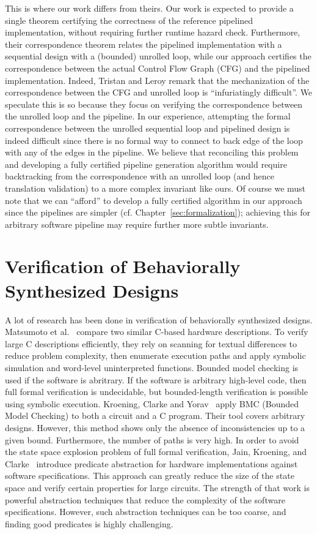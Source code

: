 This is where our work differs from theirs.  Our work is
expected to provide a single theorem certifying the
correctness of the reference pipelined implementation,
without requiring further runtime hazard check.
Furthermore, their correspondence theorem relates the
pipelined implementation with a sequential design with a
(bounded) unrolled loop, while our approach certifies the
correspondence between the actual Control Flow Graph (CFG)
and the pipelined implementation.  Indeed, Tristan and Leroy
remark that the mechanization of the correspondence between
the CFG and unrolled loop is ``infuriatingly difficult''.
We speculate this is so because they focus on verifying the
correspondence between the unrolled loop and the pipeline.
In our experience, attempting the formal correspondence between the unrolled
sequential loop and pipelined design is indeed difficult since
there is no formal way to connect to back edge of the loop
with any of the edges in the pipeline.  We believe that
reconciling this problem and developing a fully certified
pipeline generation algorithm would require backtracking
from the correspondence with an unrolled loop (and hence
translation validation) to a more complex invariant like
ours.  Of course we must note that we can ``afford'' to
develop a fully certified algorithm in our approach since
the pipelines are simpler
(cf. Chapter~\ref{sec:formalization}); achieving this for
arbitrary software pipeline may require further more subtle
invariants.

\section{Verification of Behaviorally Synthesized Designs}

A lot of research has been done in verification of behaviorally synthesized designs. Matsumoto et al.~\cite{Matsumoto} compare two similar C-based hardware descriptions. 
To verify large C descriptions efficiently, they rely on scanning for textual differences 
to reduce problem complexity, then enumerate execution paths and 
apply symbolic simulation and word-level uninterpreted functions. 
Bounded model checking is used if the software is abritrary. 
If the software is arbitrary high-level code, then full formal verification
is undecidable, but bounded-length verification is possible using symbolic execution.
Kroening, Clarke and Yorav~\cite{Kroening1} apply BMC (Bounded Model
Checking) to both a circuit and a C program. Their tool covers arbitrary designs. However,
this method shows only the absence of inconsistencies up to a given bound.
Furthermore, the number of paths is very high. 
In order to avoid the state space explosion problem of full formal verification,
Jain, Kroening, and Clarke~\cite{Clarke:2005} introduce 
predicate abstraction for hardware implementations
against software specifications. This approach can greatly reduce the
size of the state space and verify certain properties for large circuits. The strength
of that work is powerful abstraction techniques that reduce the complexity of the
software specifications. However, such abstraction techniques can be too coarse, and
finding good predicates is highly challenging. 

